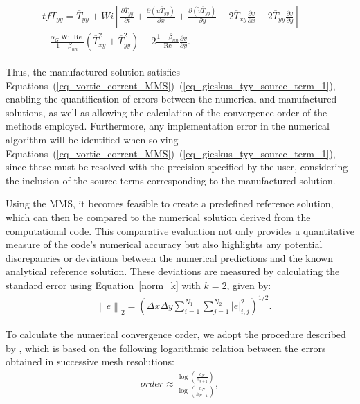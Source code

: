 \documentclass[preprint, 12pt]{elsarticle}
\begin{document}
\begin{gather}
    \begin{aligned}
        tfT_{yy} = \overline{T}_{yy} + Wi\left[\frac{\partial \overline{T}_{yy}}{\partial t} + \frac{\partial (\overline{u}\overline{T}_{yy})}{\partial x} + \frac{\partial(\widetilde{v}\overline{T}_{yy})}{\partial y} - 2\overline{T}_{xy}\frac{\partial\widetilde{v}}{\partial x} - 2\overline{T}_{yy}\frac{\partial\widetilde{v}}{\partial y}\right] &~+ \\ + \frac{\alpha_{G}\operatorname{Wi}\operatorname{Re}}{1-\beta_{nn}}\left(\overline{T}_{xy}^{2} + \overline{T}_{yy}^{2}\right) - 2\frac{1-\beta_{nn}}{\operatorname{Re}}\frac{\partial\widetilde{v}}{\partial y}.\label{eq_tyy_s_t_2}
    \end{aligned}
\end{gather}

Thus, the manufactured solution satisfies
Equations~(\ref{eq_vortic_corrent_MMS})--(\ref{eq_gieskus_tyy_source_term_1}),
enabling the quantification of errors between the numerical and manufactured
solutions, as well as allowing the calculation of the convergence order of the
methods employed. Furthermore, any implementation error in the numerical
algorithm will be identified when solving
Equations~(\ref{eq_vortic_corrent_MMS})--(\ref{eq_gieskus_tyy_source_term_1}),
since these must be resolved with the precision specified by the user,
considering the inclusion of the source terms corresponding to the manufactured
solution.

Using the MMS, it becomes feasible to create a predefined reference solution,
which can then be compared to the numerical solution derived from the
computational code. This comparative evaluation not only provides a
quantitative measure of the code's numerical accuracy but also highlights any
potential discrepancies or deviations between the numerical predictions and the
known analytical reference solution. These deviations are measured by
calculating the standard error using Equation~\eqref{norm_k} with $k = 2$,
given by:
\begin{align}
    &\left \|e\right \|_{2}=\left(\Delta x \Delta y \sum_{i=1}^{N_{1}}\sum_{j=1}^{N_{2}} \left |e\right |_{i,j}^{2}\right)^{1/2}.\label{norm_k_equal_2}
\end{align}

To calculate the numerical convergence order, we adopt the procedure described by \citet{leveque2007finite}, which is based on the following logarithmic relation between the errors obtained in successive mesh resolutions:
\begin{align}
    order \approx \frac{\log\left(\frac{e_{N}}{e_{N+1}}\right)}{\log\left(\frac{h_{N}}{h_{N+1}}\right)},\label{log_p}
\end{align}
\end{document}
